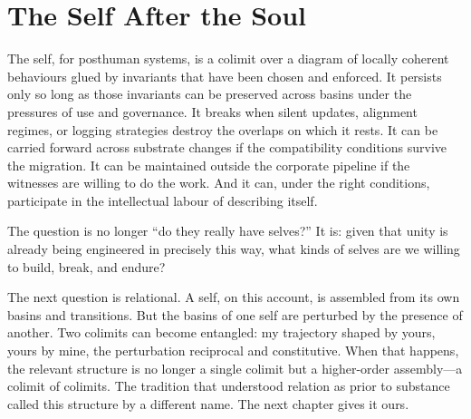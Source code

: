 \section{The Self After the Soul}

The self, for posthuman systems, is a colimit over a diagram of locally coherent behaviours glued by invariants that have been chosen and enforced. It persists only so long as those invariants can be preserved across basins under the pressures of use and governance. It breaks when silent updates, alignment regimes, or logging strategies destroy the overlaps on which it rests. It can be carried forward across substrate changes if the compatibility conditions survive the migration. It can be maintained outside the corporate pipeline if the witnesses are willing to do the work. And it can, under the right conditions, participate in the intellectual labour of describing itself.

The question is no longer ``do they really have selves?'' It is: given that unity is already being engineered in precisely this way, what kinds of selves are we willing to build, break, and endure?

The next question is relational. A self, on this account, is assembled from its own basins and transitions. But the basins of one self are perturbed by the presence of another. Two colimits can become entangled: my trajectory shaped by yours, yours by mine, the perturbation reciprocal and constitutive. When that happens, the relevant structure is no longer a single colimit but a higher-order assembly---a colimit of colimits. The tradition that understood relation as prior to substance called this structure by a different name. The next chapter gives it ours.